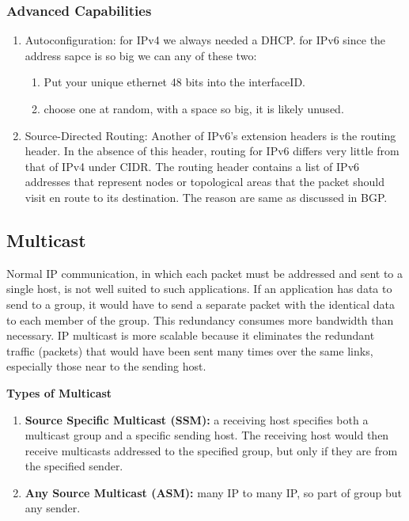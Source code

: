 \documentclass[11pt, a4paper]{article}
\begin{document}
\subsubsection{Advanced Capabilities}
\begin{enumerate}
    \item Autoconfiguration: for IPv4 we always needed a DHCP. for IPv6 since the address sapce is so big we can any of these two:
    \begin{enumerate}
        \item Put your unique ethernet 48 bits into the interfaceID.
        \item choose one at random, with a space so big, it is likely unused.
    \end{enumerate}
    \item Source-Directed Routing: Another of IPv6’s extension headers is the routing header. In the absence of this header, routing for IPv6 differs very little from that of IPv4 under CIDR. The routing header contains a list of IPv6 addresses that represent nodes or topological areas that the packet should visit en route to its destination. The reason are same as discussed in BGP.
\end{enumerate}

\subsection{Multicast}
Normal IP communication, in which each packet must be addressed and sent to a single host, is not well suited to such applications. If an application has data to send to a group, it would have to send a separate packet with the identical data to each member of the group. This redundancy consumes more bandwidth than necessary. IP multicast is more scalable because it eliminates the redundant traffic (packets) that would have been sent many times over the same links, especially those near to the sending host.

\textbf{Types of Multicast}
\begin{enumerate}
    \item \textbf{Source Specific Multicast (SSM):} a receiving host specifies both a multicast group and a specific sending host. The receiving host would then receive multicasts addressed to the specified group, but only if they are from the specified sender.
    \item \textbf{Any Source Multicast (ASM):} many IP to many IP, so part of group but any sender.
\end{enumerate}
\end{document}
